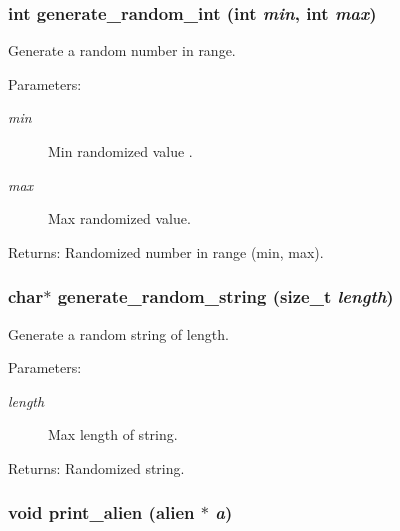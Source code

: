 \subsubsection{\setlength{\rightskip}{0pt plus 5cm}int generate\_\-random\_\-int (int {\em min}, int {\em max})}\label{struct_8h_d648b1aad3b03e6e8ac8db8197efd343}


Generate a random number in range. 

\begin{Desc}
\item[Parameters:]
\begin{description}
\item[{\em min}]Min randomized value . \item[{\em max}]Max randomized value. \end{description}
\end{Desc}
\begin{Desc}
\item[Returns:]Randomized number in range (min, max). \end{Desc}
\subsubsection{\setlength{\rightskip}{0pt plus 5cm}char$\ast$ generate\_\-random\_\-string (size\_\-t {\em length})}\label{struct_8h_ae29e50030db5b7eec24f334e5fb5d44}


Generate a random string of length. 

\begin{Desc}
\item[Parameters:]
\begin{description}
\item[{\em length}]Max length of string. \end{description}
\end{Desc}
\begin{Desc}
\item[Returns:]Randomized string. \end{Desc}
\subsubsection{\setlength{\rightskip}{0pt plus 5cm}void print\_\-alien (\bf{alien} $\ast$ {\em a})}\label{struct_8h_3f1573acf08e9e31f221854df791ab06}


